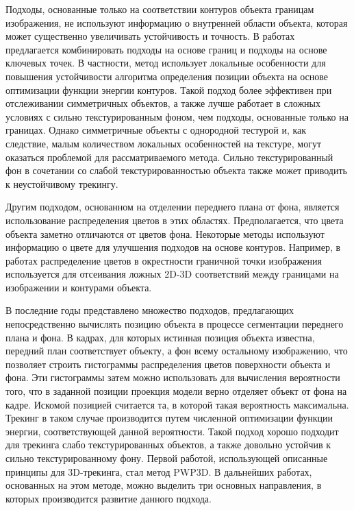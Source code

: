 Подходы, основанные только на соответствии контуров объекта границам
изображения, не используют информацию о внутренней области объекта, которая
может существенно увеличивать устойчивость и точность.
В работах \cite{VacchettiEdges2004,ChoiFeaturesAndEdges,Bugaev_2018_ECCV}
предлагается комбинировать подходы на основе границ и подходы на основе
ключевых точек.
В частности, метод \cite{Bugaev_2018_ECCV} использует локальные особенности для
повышения устойчивости алгоритма определения позиции объекта на основе
оптимизации функции энергии контуров.
Такой подход более эффективен при отслеживании симметричных объектов, а также
лучше работает в сложных условиях с сильно текстурированным фоном, чем подходы,
основанные только на границах.
Однако симметричные объекты с однородной тестурой и, как следствие, малым
количеством локальных особенностей на текстуре, могут оказаться проблемой для
рассматриваемого метода.
Сильно текстурированный фон в сочетании со слабой текстурированностью
объекта также может приводить к неустойчивому трекингу.

Другим подходом, основанном на отделении переднего плана от фона, является
использование распределения цветов в этих областях.
Предполагается, что цвета объекта заметно отличаются от цветов фона.
Некоторые методы \cite{SeoHinterstoisser2014,WangZhong2015,Zhong2018}
используют информацию о цвете для улучшения подходов на основе контуров.
Например, в работах \cite{SeoHinterstoisser2014,WangZhong2015} распределение
цветов в окрестности граничной точки изображения используется для отсеивания
ложных 2D-3D соответствий между границами на изображении и контурами объекта.

В последние годы представлено множество подходов, предлагающих непосредственно
вычислять позицию объекта в процессе сегментации переднего плана и фона.
В кадрах, для которых истинная позиция объекта известна, передний план
соответствует объекту, а фон всему остальному изображению, что позволяет
строить гистограммы распределения цветов поверхности объекта и фона.
Эти гистограммы затем можно использовать для вычисления вероятности того, что в
заданной позиции проекция модели верно отделяет объект от фона на кадре.
Искомой позицией считается та, в которой такая вероятность максимальна.
Трекинг в таком случае производится путем численной оптимизации функции
энергии, соответствующей данной вероятности.
Такой подход хорошо подходит для трекинга слабо текстурированных объектов, а
также довольно устойчив к сильно текстурированному фону.
Первой работой, использующей описанные принципы для 3D-трекинга, стал метод
PWP3D\cite{PWP3D}.
В дальнейших работах, основанных на этом методе, можно выделить три основных
направления, в которых производится развитие данного подхода.

